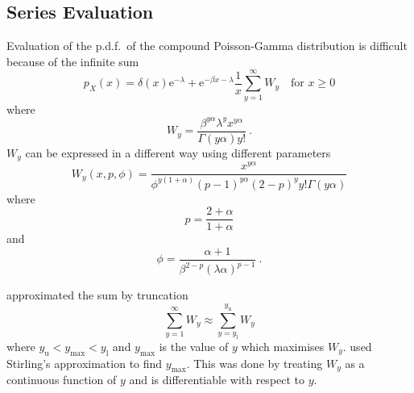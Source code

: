 \documentclass[12pt, a4paper]{memoir}
\newcommand{\euler}{\mathrm{e}}
\begin{document}
\subsection{Series Evaluation}
Evaluation of the p.d.f.~of the compound Poisson-Gamma distribution is difficult because of the infinite sum
\begin{equation}
p_X(x) = 
\delta(x) \euler^{-\lambda}
+
\euler^{-\beta x-\lambda}\frac{1}{x}\sum_{y=1}^{\infty}W_y
\quad\text{for }x\geqslant 0
\end{equation}
where
\begin{equation}
W_y = \frac{\beta^{y\alpha}\lambda^yx^{y\alpha}}{\Gamma(y\alpha)y!} \ .
\end{equation}
$W_y$ can be expressed in a different way using different parameters
\begin{equation}
W_y(x,p,\phi)=\frac{x^{y\alpha}}{\phi^{y(1+\alpha)}(p-1)^{y\alpha}(2-p)^yy!\Gamma(y\alpha)}
\end{equation}
where
\begin{equation}
p=\frac{2+\alpha}{1+\alpha}
\end{equation}
and
\begin{equation}
\phi = \frac{\alpha+1}{\beta^{2-p}(\lambda\alpha)^{p-1}} \ .
\end{equation}

\cite{dunn2005series} approximated the sum by truncation
\begin{equation}
\sum_{y=1}^\infty W_y \approx \sum_{y=y_\text{l}}^{y_\text{u}}W_y
\end{equation}
where $y_\text{u}<y_{\text{max}}<y_\text{l}$ and $y_{\text{max}}$ is the value of $y$ which maximises $W_y$. \cite{dunn2005series} used Stirling's approximation to find $y_{\text{max}}$. This was done by treating $W_y$ as a continuous function of $y$ and is differentiable with respect to $y$.
\end{document}
